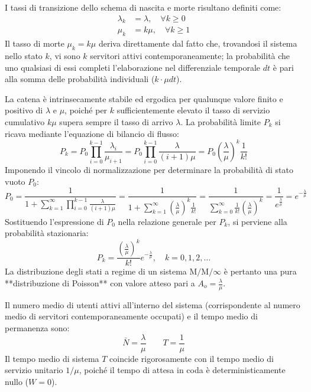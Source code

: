 \documentclass[11pt, a4paper]{article}
\begin{document}
I tassi di transizione dello schema di nascita e morte risultano definiti come:
\begin{align*}
\lambda_k &= \lambda, \quad \forall k \ge 0 \\
\mu_k &= k\mu, \quad \forall k \ge 1
\end{align*}
Il tasso di morte $\mu_k = k\mu$ deriva direttamente dal fatto che, trovandosi il sistema nello stato $k$, vi sono $k$ servitori attivi contemporaneamente; la probabilità che uno qualsiasi di essi completi l'elaborazione nel differenziale temporale $dt$ è pari alla somma delle probabilità individuali ($k \cdot \mu dt$).


La catena è intrinsecamente stabile ed ergodica per qualunque valore finito e positivo di $\lambda$ e $\mu$, poiché per $k$ sufficientemente elevato il tasso di servizio cumulativo $k\mu$ supera sempre il tasso di arrivo $\lambda$. La probabilità limite $P_k$ si ricava mediante l'equazione di bilancio di flusso:
\[
P_k = P_0 \prod_{i=0}^{k-1} \frac{\lambda_{i}}{\mu_{i+1}} = P_0 \prod_{i=0}^{k-1} \frac{\lambda}{(i+1)\mu} = P_0 \left( \frac{\lambda}{\mu} \right)^k \frac{1}{k!}
\]
Imponendo il vincolo di normalizzazione per determinare la probabilità di stato vuoto $P_0$:
\[
P_0 = \frac{1}{1 + \sum_{k=1}^{\infty} \prod_{i=0}^{k-1} \frac{\lambda}{(i+1)\mu}} = \frac{1}{1 + \sum_{k=1}^{\infty} \left( \frac{\lambda}{\mu} \right)^k \frac{1}{k!}} = \frac{1}{\sum_{k=0}^{\infty} \frac{1}{k!} \left( \frac{\lambda}{\mu} \right)^k} = \frac{1}{e^{\frac{\lambda}{\mu}}} = e^{-\frac{\lambda}{\mu}}
\]
Sostituendo l'espressione di $P_0$ nella relazione generale per $P_k$, si perviene alla probabilità stazionaria:
\[
\boxed{P_k = \frac{\left( \frac{\lambda}{\mu} \right)^k}{k!} e^{-\frac{\lambda}{\mu}}, \quad k = 0, 1, 2, \dots}
\]
La distribuzione degli stati a regime di un sistema $\mathrm{M/M/\infty}$ è pertanto una pura **distribuzione di Poisson** con valore atteso pari a $A_o = \frac{\lambda}{\mu}$.

Il numero medio di utenti attivi all'interno del sistema (corrispondente al numero medio di servitori contemporaneamente occupati) e il tempo medio di permanenza sono:
\[
\boxed{\bar{N} = \frac{\lambda}{\mu}} \qquad \boxed{T = \frac{1}{\mu}}
\]
Il tempo medio di sistema $T$ coincide rigorosamente con il tempo medio di servizio unitario $1/\mu$, poiché il tempo di attesa in coda è deterministicamente nullo ($W = 0$).
\end{document}
